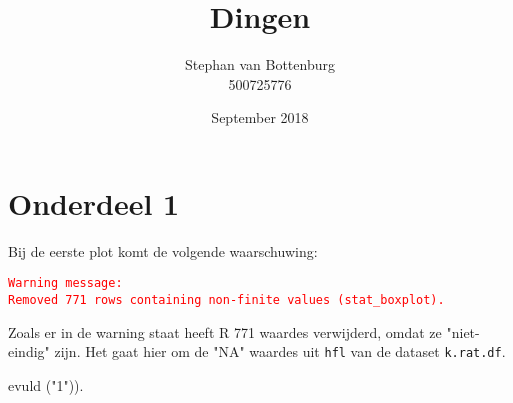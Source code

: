 \documentclass{article}
\title{Dingen}
\author{Stephan van Bottenburg\\500725776}
\date{September 2018}
\begin{document}
\maketitle
\clearpage
{}
\clearpage

\section*{Onderdeel 1}

Bij de eerste plot komt de volgende waarschuwing:\par 
\textcolor{red}{\texttt{Warning message:\\ Removed 771 rows containing non-finite values (stat\_boxplot).}}\par
Zoals er in de warning staat heeft R 771 waardes verwijderd, omdat ze "niet-eindig" zijn. Het gaat hier om de "NA" waardes uit \texttt{hfl} van de dataset \texttt{k.rat.df}. \par 


\clearpage
{} 
evuld ("1")). 
\end{document}
